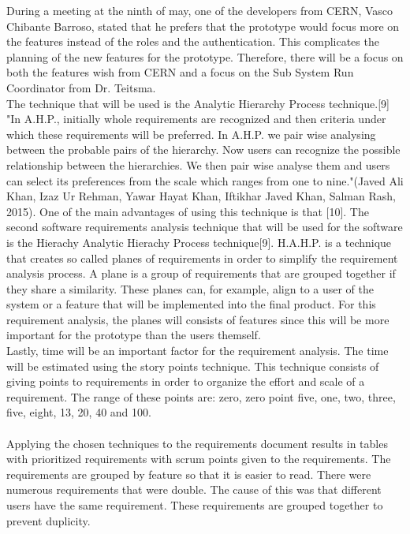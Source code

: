 \documentclass[paper=a4, fontsize=11pt,twoside]{scrartcl}	%
\begin{document}
During a meeting at the ninth of may, one of the developers from CERN, Vasco Chibante Barroso, stated that he prefers that the prototype would focus more on the features instead of the roles and the authentication. This complicates the planning of the new features for the prototype. Therefore, there will be a focus on both the features wish from CERN and a focus on the Sub System Run Coordinator from Dr. Teitsma. \\ 
The technique that will be used is the Analytic Hierarchy Process technique.[9] "In A.H.P., initially whole requirements are recognized and then criteria under which these requirements will be preferred. In A.H.P. we pair wise analysing  between  the  probable  pairs  of  the  hierarchy. 
Now users can recognize the possible relationship between 
the hierarchies. We then pair wise analyse them and users can select its preferences from the scale which ranges from 
one to nine."(Javed Ali Khan, Izaz Ur Rehman, Yawar Hayat Khan, Iftikhar Javed Khan, Salman Rash, 2015). One of the main advantages of using this technique is that [10]. The second software requirements analysis technique that will be used for the software is the Hierachy Analytic Hierachy Process technique[9]. H.A.H.P. is a technique that creates so called planes of requirements in order to simplify the requirement analysis process. A plane is a group of requirements that are grouped together if they share a similarity. These planes can, for example, align to a user of the system or a feature that will be implemented into the final product. For this requirement analysis, the planes will consists of features since this will be more important for the prototype than the users themself. \\
Lastly, time will be an important factor for the requirement analysis. The time will be estimated using the story points technique. This technique consists of giving  points to requirements in order to organize the effort and scale of a requirement. The range of these points are:  zero, zero point five, one, two, three, five, eight, 13, 20, 40 and 100. \\ \\
Applying the chosen techniques to the requirements document results in tables with prioritized requirements with scrum points given to the requirements. The requirements are grouped by feature so that it is easier to read. There were numerous requirements that were double. The cause of this was that different users have the same requirement. These requirements are grouped together to prevent duplicity. \\
\end{document}
